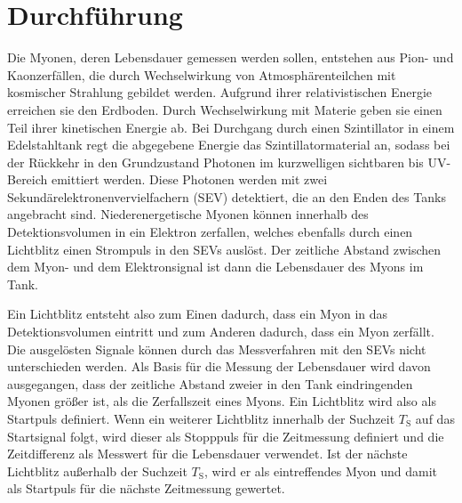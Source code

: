 \section{Durchf\"{u}hrung}

Die Myonen, deren Lebensdauer gemessen werden sollen, entstehen aus Pion- und Kaonzerfällen, die durch Wechselwirkung von Atmosphärenteilchen mit kosmischer Strahlung gebildet werden. Aufgrund ihrer relativistischen Energie erreichen sie den Erdboden. Durch Wechselwirkung mit Materie geben sie einen Teil ihrer kinetischen Energie ab. Bei Durchgang durch einen Szintillator in einem Edelstahltank regt die abgegebene Energie das Szintillatormaterial an, sodass bei der Rückkehr in den Grundzustand Photonen im kurzwelligen sichtbaren bis UV-Bereich emittiert werden. Diese Photonen werden mit zwei Sekundärelektronenvervielfachern (SEV) detektiert, die an den Enden des Tanks angebracht sind. Niederenergetische Myonen können innerhalb des Detektionsvolumen in ein Elektron zerfallen, welches ebenfalls durch einen Lichtblitz einen Strompuls in den SEVs auslöst. Der zeitliche Abstand zwischen dem Myon- und dem Elektronsignal ist dann die Lebensdauer des Myons im Tank.

Ein Lichtblitz entsteht also zum Einen dadurch, dass ein Myon in das Detektionsvolumen eintritt und zum Anderen dadurch, dass ein Myon zerfällt. Die ausgelösten Signale können durch das Messverfahren mit den SEVs nicht unterschieden werden. Als Basis für die Messung der Lebensdauer wird davon ausgegangen, dass der zeitliche Abstand zweier in den Tank eindringenden Myonen größer ist, als die Zerfallszeit eines Myons. Ein Lichtblitz wird also als Startpuls definiert. Wenn ein weiterer Lichtblitz innerhalb der Suchzeit $T_\text{S}$ auf das Startsignal folgt, wird dieser als Stopppuls für die Zeitmessung definiert und die Zeitdifferenz als Messwert für die Lebensdauer verwendet. Ist der nächste Lichtblitz außerhalb der Suchzeit $T_\text{S}$, wird er als eintreffendes Myon und damit als Startpuls für die nächste Zeitmessung gewertet.

